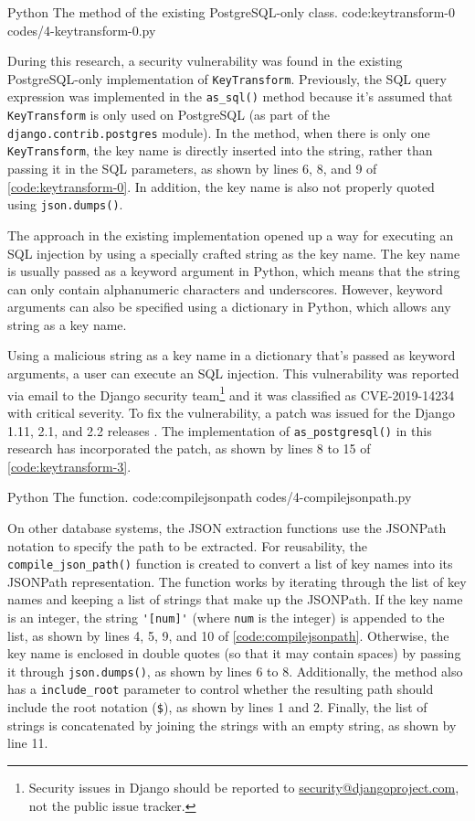 \listing
{Python}
{The  method of the existing PostgreSQL-only  class.}
{code:keytransform-0}
{codes/4-keytransform-0.py}

During this research, a security vulnerability was found in the existing
PostgreSQL-only implementation of \verb|KeyTransform|. Previously, the SQL
query expression was implemented in the \verb|as_sql()| method because it's
assumed that \verb|KeyTransform| is only used on PostgreSQL (as part of the
\verb|django.contrib.postgres| module). In the method, when there is only one
\verb|KeyTransform|, the key name is directly inserted into the string, rather
than passing it in the SQL parameters, as shown by lines 6, 8, and 9 of
\autoref{code:keytransform-0}. In addition, the key name is also not properly
quoted using \verb|json.dumps()|.

The approach in the existing implementation opened up a way for executing an
SQL injection by using a specially crafted string as the key name. The key name
is usually passed as a keyword argument in Python, which means that the string
can only contain alphanumeric characters and underscores. However, keyword
arguments can also be specified using a dictionary in Python, which allows any
string as a key name.

Using a malicious string as a key name in a dictionary that's passed as keyword
arguments, a user can execute an SQL injection. This vulnerability was reported
via email to the Django security team\footnote{Security issues in Django should
be reported to
\href{mailto:security@djangoproject.com}{security@djangoproject.com}, not the
public issue tracker.} and it was classified as CVE-2019-14234 \cite{cve} with
critical severity. To fix the vulnerability, a patch was issued for the Django
1.11, 2.1, and 2.2 releases \cite{django:securityrelease}. The implementation
of \verb|as_postgresql()| in this research has incorporated the patch, as shown
by lines 8 to 15 of \autoref{code:keytransform-3}.

\listing
{Python}
{The  function.}
{code:compilejsonpath}
{codes/4-compilejsonpath.py}

On other database systems, the JSON extraction functions use the JSONPath
notation to specify the path to be extracted. For reusability, the
\verb|compile_json_path()| function is created to convert a list of key names
into its JSONPath representation. The function works by iterating through the
list of key names and keeping a list of strings that make up the JSONPath. If
the key name is an integer, the string \verb|'[num]'| (where \verb|num| is the
integer) is appended to the list, as shown by lines 4, 5, 9, and 10 of
\autoref{code:compilejsonpath}. Otherwise, the key name is enclosed in double
quotes (so that it may contain spaces) by passing it through
\verb|json.dumps()|, as shown by lines 6 to 8. Additionally, the method also
has a \verb|include_root| parameter to control whether the resulting path
should include the root notation (\verb|$|), as shown by lines 1 and 2.
Finally, the list of strings is concatenated by joining the strings with an
empty string, as shown by line 11.

